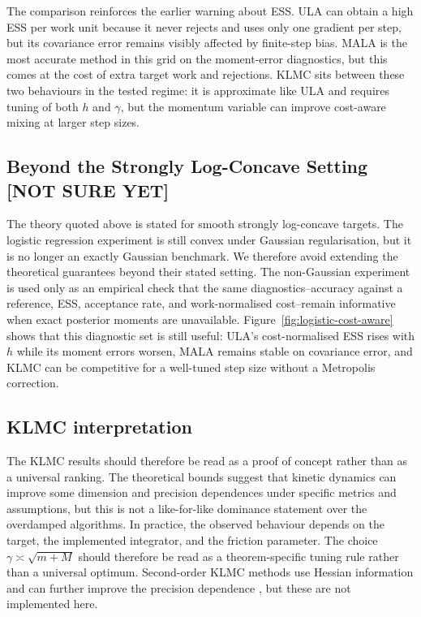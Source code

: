 \documentclass[a4paper,11pt, titlepage]{article}
\theoremstyle{definition}
\theoremstyle{plain}
\theoremstyle{remark}
\begin{document}
The comparison reinforces the earlier warning about ESS. ULA can obtain a high
ESS per work unit because it never rejects and uses only one gradient per
step, but its covariance error remains visibly affected by finite-step
bias. MALA is the most accurate method in this grid on the moment-error
diagnostics, but this comes at the cost of extra target work and
rejections. KLMC sits between these two
behaviours in the tested regime: it is approximate like ULA and requires
tuning of both $h$ and $\gamma$, but the momentum variable can improve
cost-aware mixing at larger step sizes.

\subsection{Beyond the Strongly Log-Concave Setting [NOT SURE YET]}
\label{sec:ext-nonconvex}

The theory quoted above is stated for smooth strongly log-concave targets.
The logistic regression experiment is still convex under Gaussian
regularisation, but it is no longer an exactly Gaussian benchmark. We
therefore avoid extending the theoretical guarantees beyond their stated
setting. The non-Gaussian experiment is used only as an empirical check
that the same diagnostics--accuracy against a reference, ESS, acceptance
rate, and work-normalised cost--remain informative when exact posterior moments
are unavailable. Figure~\ref{fig:logistic-cost-aware} shows that this
diagnostic set is still useful: ULA's cost-normalised ESS rises with $h$
while its moment errors worsen, MALA remains stable on covariance error,
and KLMC can be competitive for a well-tuned step size without a
Metropolis correction.

\subsection{KLMC interpretation}
\label{sec:results-klmc-interpretation}

The KLMC results should therefore be read as a proof of concept rather
than as a universal ranking. The theoretical bounds suggest that kinetic
dynamics can improve some dimension and precision dependences under
specific metrics and assumptions, but this is not a like-for-like
dominance statement over the overdamped algorithms. In practice, the
observed behaviour depends on the target, the implemented integrator, and
the friction parameter. The choice
$\gamma\asymp\sqrt{m+M}$ should therefore be read as a theorem-specific
tuning rule rather than a universal optimum. Second-order KLMC methods
use Hessian information and can further improve the precision dependence
\citep[Section~4]{DalalyanRiouDurand2020}, but these are not implemented
here.
\end{document}
